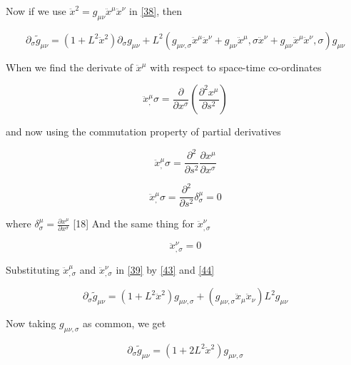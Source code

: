 \documentclass{article}
\begin{document}
Now if we use $\ddot x^2=g_{\mu\nu}\ddot x^\mu \ddot x^\nu$ in \eqref{38}, then


\begin{equation}
    \partial_\sigma \tilde{g}_{\mu\nu} = (1 + L^2\ddot x^2)\partial_\sigma g_{\mu\nu} + L^2(g_{\mu\nu,\sigma}\ddot x^\mu \ddot x^\nu + g_{\mu\nu}\ddot x^\mu,\sigma \ddot x^\nu + g_{\mu\nu}\ddot x^ \mu \ddot x^\nu,\sigma)g_{\mu\nu}
\label{39}
\end{equation}

When we find the derivate of $\ddot x^\mu$ with respect to space-time co-ordinates

\begin{equation}
    {\ddot x^\mu_,\sigma} = \frac{\partial}{\partial x^\sigma}\left(\frac{\partial^2 x^\mu}{\partial s^2}\right)
\label{40}
\end{equation}

and now using the commutation property of partial derivatives

\begin{equation}
    {\ddot x^\mu_,\sigma} = \frac{\partial^2}{\partial s^2}\frac{\partial x^\mu}{\partial x^\sigma}
\label{41}
\end{equation}

\begin{equation}
    {\ddot x^\mu_,\sigma} = \frac{\partial^2}{\partial s^2}{\delta^\mu_\sigma} = 0
\label{42}
\end{equation}

where $\delta^\mu_\sigma = \frac{\partial x^\mu}{\partial x^\sigma}
$ [18]
And the same thing for ${\ddot x^\nu _{,\sigma}}$


\begin{equation}
    {\ddot x^\nu _{,\sigma}} = 0
\label{43}
\end{equation}


Substituting ${\ddot x^\mu _{,\sigma}}$ and ${\ddot x^\nu _{,\sigma}}$ in \eqref{39} by \eqref{43} and \eqref{44}

\begin{equation}
    \partial_{\sigma}\tilde{g}_{\mu\nu} = (1 + L^2\ddot x^2)g_{\mu\nu,\sigma} + (g_{\mu\nu,\sigma}\ddot x_{\mu}\ddot x_{\nu})L^2 g_{\mu\nu}
\label{44}
\end{equation}

Now taking $g_{\mu\nu,\sigma}$ as common, we get


\begin{equation}
    \partial_{\sigma}\tilde{g}_{\mu\nu} = (1 + 2L^2\ddot x^2)g_{\mu\nu,\sigma}
\label{45}
\end{equation}
\end{document}
